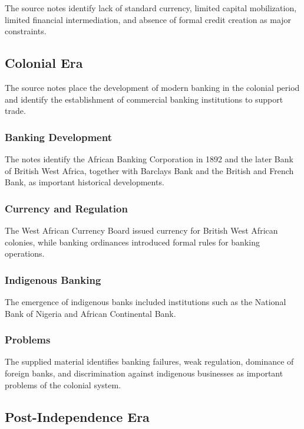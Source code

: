 \documentclass[
]{article}
\begin{document}
The source notes identify lack of standard currency, limited capital mobilization, limited financial intermediation, and absence of formal credit creation as major constraints.

\subsection{Colonial Era}\label{colonial-era}

The source notes place the development of modern banking in the colonial period and identify the establishment of commercial banking institutions to support trade.

\subsubsection{Banking Development}\label{banking-development}

The notes identify the African Banking Corporation in 1892 and the later Bank of British West Africa, together with Barclays Bank and the British and French Bank, as important historical developments.

\subsubsection{Currency and Regulation}\label{currency-and-regulation}

The West African Currency Board issued currency for British West African colonies, while banking ordinances introduced formal rules for banking operations.

\subsubsection{Indigenous Banking}\label{indigenous-banking}

The emergence of indigenous banks included institutions such as the National Bank of Nigeria and African Continental Bank.

\subsubsection{Problems}\label{problems}

The supplied material identifies banking failures, weak regulation, dominance of foreign banks, and discrimination against indigenous businesses as important problems of the colonial system.

\subsection{Post-Independence Era}\label{post-independence-era}
\end{document}
